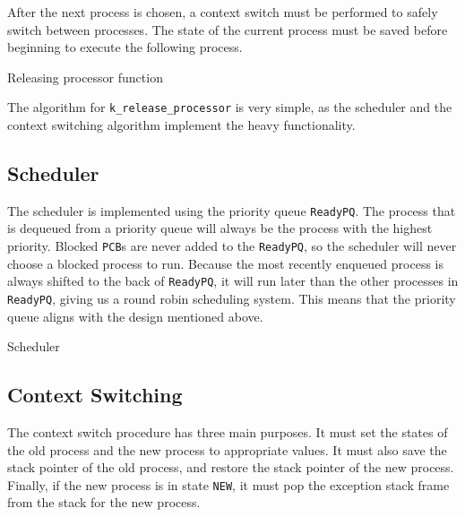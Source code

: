 \documentclass[12pt]{report}
\begin{document}
After the next process is chosen, a context switch must be performed to safely switch between processes.  The state of the current process must be saved before beginning to execute the following process.

\begin{algorithm}[H]
  \caption{Releasing processor function}
  \begin{algorithmic}[1]
    \EndProcedure
  \end{algorithmic}
\end{algorithm}

The algorithm for \texttt{k\_release\_processor} is very simple, as the scheduler and the context switching algorithm implement the heavy functionality.

\subsection{Scheduler}
The scheduler is implemented using the priority queue \texttt{ReadyPQ}.  The process that is dequeued from a priority queue will always be the process with the highest priority.  Blocked \texttt{PCB}s are never added to the \texttt{ReadyPQ}, so the scheduler will never choose a blocked process to run.  Because the most recently enqueued process is always shifted to the back of \texttt{ReadyPQ}, it will run later than the other processes in \texttt{ReadyPQ}, giving us a round robin scheduling system.  This means that the priority queue aligns with the design mentioned above.

\begin{algorithm}[H]
  \caption{Scheduler}
  \begin{algorithmic}[1]
		\EndIf
		\EndIf
      \EndIf
    \EndProcedure
  \end{algorithmic}
\end{algorithm}

\subsection{Context Switching}
The context switch procedure has three main purposes.  It must set the states of the old process and the new process to appropriate values.  It must also save the stack pointer of the old process, and restore the stack pointer of the new process.  Finally, if the new process is in state \texttt{NEW}, it must pop the exception stack frame from the stack for the new process.
\end{document}
